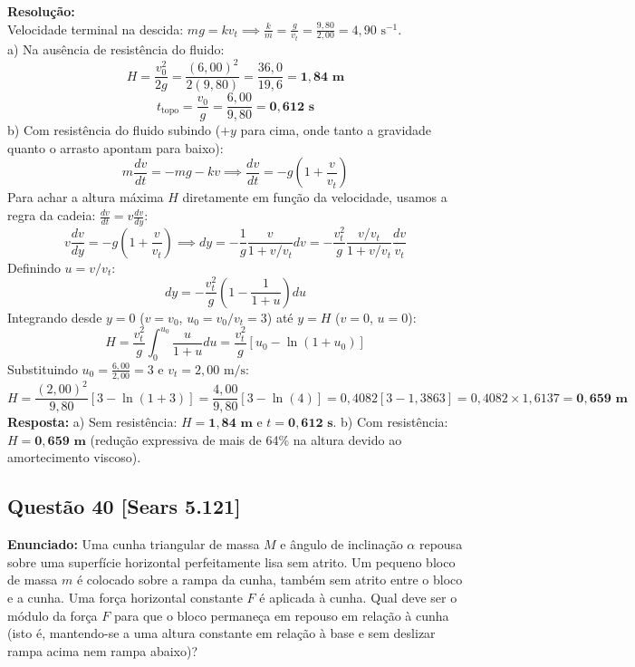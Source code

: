 \documentclass[11pt,a4paper]{article}
\begin{document}
\noindent
\textbf{Resolução:}\\
Velocidade terminal na descida: $mg = k v_t \implies \frac{k}{m} = \frac{g}{v_t} = \frac{9,80}{2,00} = 4,90\text{ s}^{-1}$.\\
a) Na ausência de resistência do fluido:
\[ H = \frac{v_0^2}{2g} = \frac{(6,00)^2}{2(9,80)} = \frac{36,0}{19,6} = \mathbf{1,84\text{ m}} \]
\[ t_{\text{topo}} = \frac{v_0}{g} = \frac{6,00}{9,80} = \mathbf{0,612\text{ s}} \]
b) Com resistência do fluido subindo ($+y$ para cima, onde tanto a gravidade quanto o arrasto apontam para baixo):
\[ m \frac{dv}{dt} = -mg - kv \implies \frac{dv}{dt} = -g \left(1 + \frac{v}{v_t}\right) \]
Para achar a altura máxima $H$ diretamente em função da velocidade, usamos a regra da cadeia: $\frac{dv}{dt} = v \frac{dv}{dy}$:
\[ v \frac{dv}{dy} = -g \left(1 + \frac{v}{v_t}\right) \implies dy = -\frac{1}{g} \frac{v}{1 + v/v_t} dv = -\frac{v_t^2}{g} \frac{v/v_t}{1 + v/v_t} \frac{dv}{v_t} \]
Definindo $u = v/v_t$:
\[ dy = -\frac{v_t^2}{g} \left(1 - \frac{1}{1+u}\right) du \]
Integrando desde $y=0$ ($v=v_0$, $u_0 = v_0/v_t = 3$) até $y=H$ ($v=0$, $u=0$):
\[ H = \frac{v_t^2}{g} \int_0^{u_0} \frac{u}{1+u} du = \frac{v_t^2}{g} [ u_0 - \ln(1 + u_0) ] \]
Substituindo $u_0 = \frac{6,00}{2,00} = 3$ e $v_t = 2,00\text{ m/s}$:
\[ H = \frac{(2,00)^2}{9,80} [ 3 - \ln(1 + 3) ] = \frac{4,00}{9,80} [ 3 - \ln(4) ] = 0,4082 [ 3 - 1,3863 ] = 0,4082 \times 1,6137 = \mathbf{0,659\text{ m}} \]
\textbf{Resposta:} a) Sem resistência: $H = \mathbf{1,84\text{ m}}$ e $t = \mathbf{0,612\text{ s}}$. b) Com resistência: $H = \mathbf{0,659\text{ m}}$ (redução expressiva de mais de 64\% na altura devido ao amortecimento viscoso).

\vspace{0.3cm}
\subsection*{Questão 40 [Sears 5.121]}
\textbf{Enunciado:} Uma cunha triangular de massa $M$ e ângulo de inclinação $\alpha$ repousa sobre uma superfície horizontal perfeitamente lisa sem atrito. Um pequeno bloco de massa $m$ é colocado sobre a rampa da cunha, também sem atrito entre o bloco e a cunha. Uma força horizontal constante $F$ é aplicada à cunha. Qual deve ser o módulo da força $F$ para que o bloco permaneça em repouso em relação à cunha (isto é, mantendo-se a uma altura constante em relação à base e sem deslizar rampa acima nem rampa abaixo)?
\end{document}
